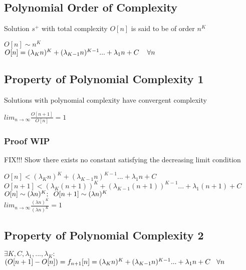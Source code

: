 \documentclass[11pt]{article}
\begin{document}
\subsection{Polynomial Order of Complexity}
Solution $s^+$ with total complexity $O[n]$ is said to be of order $n^K$
\begin{center}
$
 O[n] \sim n^K
$
\\ \vspace{2mm}
$O[n] = (\lambda_{K} n)^{K} + (\lambda_{K-1} n)^{K-1}... + \lambda_1 n +  C \hspace{4mm} \forall n$
\end{center}








\subsection{Property of Polynomial  Complexity 1}
Solutions with polynomial complexity have convergent complexity
\begin{center}
$
lim_{n \rightarrow \infty} \frac{O[n+1]}{O[n]} = 1
$
\end{center}
\subsubsection{Proof WIP}
FIX!!!
Show there exists no constant satisfying the decreasing limit condition
\begin{center}
$
O[n] < (\lambda_K n)^K + (\lambda_{K-1} n)^{K-1}... + \lambda_1 n + C
$
\\ \vspace{2mm}
$
O[n+1] < (\lambda_K (n+1))^K + (\lambda_{K-1} (n+1))^{K-1}... + \lambda_1 (n+1) + C
$
\\ \vspace{2mm}
$
O[n] \sim (\lambda n)^K; \hspace{2mm} O[n+1] \sim  (\lambda n)^K
$
\\ \vspace{2mm}
$
lim_{n \rightarrow \infty} \frac{(\lambda n)^K}{(\lambda n)^K} = 1
$
\end{center}







\subsection{Property of Polynomial Complexity 2}
\begin{center}
$
\exists K,C,\lambda_1,...,\lambda_K :
$
\\ \vspace{2mm}
$
( O[n+1] - O[n] ) = f_{n+1}[n] = (\lambda_K n)^K + (\lambda_{K-1} n)^{K-1}... + \lambda_1 n + C \hspace{3mm} \forall n
$
\end{center}
\end{document}
